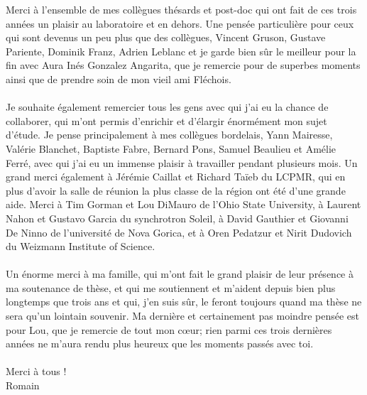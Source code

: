Merci à l'ensemble de mes collègues thésards et post-doc qui ont fait de ces trois années un plaisir au laboratoire et en dehors. Une pensée particulière pour ceux qui sont devenus un peu plus que des collègues, Vincent Gruson, Gustave Pariente, Dominik Franz, Adrien Leblanc et je garde bien sûr le meilleur pour la fin avec Aura Inés Gonzalez Angarita, que je remercie pour de superbes moments ainsi que de prendre soin de mon vieil ami Fléchois. \\ \\
Je souhaite également remercier tous les gens avec qui j'ai eu la chance de collaborer, qui m'ont permis d'enrichir et d'élargir énormément mon sujet d'étude. Je pense principalement à mes collègues bordelais, Yann Mairesse, Valérie Blanchet, Baptiste Fabre, Bernard Pons, Samuel Beaulieu et Amélie Ferré, avec qui j'ai eu un immense plaisir à travailler pendant plusieurs mois. Un grand merci également à Jérémie Caillat et Richard Taïeb du LCPMR, qui en plus d'avoir la salle de réunion la plus classe de la région ont été d'une grande aide. Merci à Tim Gorman et Lou DiMauro de l'Ohio State University, à Laurent Nahon et Gustavo Garcia du synchrotron Soleil, à David Gauthier et Giovanni De Ninno de l'université de Nova Gorica, et à Oren Pedatzur et Nirit Dudovich du Weizmann Institute of Science. \\ \\
Un énorme merci à ma famille, qui m'ont fait le grand plaisir de leur présence à ma soutenance de thèse, et qui me soutiennent et m'aident depuis bien plus longtemps que trois ans et qui, j'en suis sûr, le feront toujours quand ma thèse ne sera qu'un lointain souvenir. Ma dernière et certainement pas moindre pensée est pour Lou, que je remercie de tout mon cœur; rien parmi ces trois dernières années ne m'aura rendu plus heureux que les moments passés avec toi.\\ \\
Merci à tous !\\
Romain